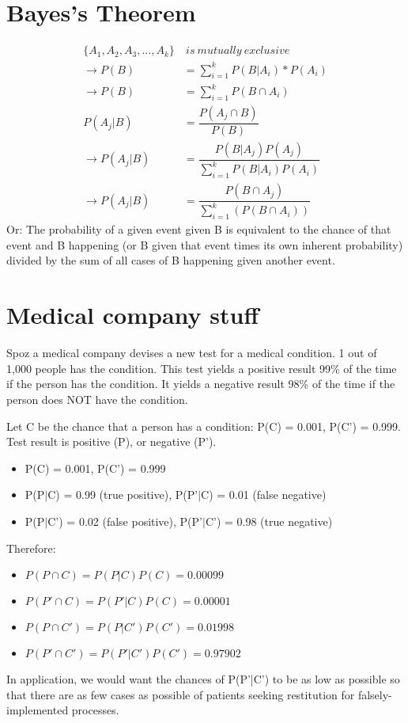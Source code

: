 \documentclass[]{article}
\begin{document}
	\pagebreak
	\section{Bayes's Theorem}
		\begin{align*}
			\{A_1, A_2, A_3,...,A_k\}&\ is\ mutually\ exclusive\\ 
			        \rightarrow P(B) &= \sum_{i = 1}^{k}P(B|A_i)*P(A_i) \\
			        \rightarrow P(B) &= \sum_{i = 1}^{k}P(B\cap A_i) \\
			                P(A_j|B) &= \dfrac{P(A_j\cap B)}{P(B)} \\
			    \rightarrow P(A_j|B) &= \dfrac{P(B|A_j)P(A_j)}
			                            {
				                            \sum_{i=1}^{k}P(B|A_i)P(A_i)
			                            }\\
			    \rightarrow P(A_j|B) &= \dfrac{P(B\cap A_j)}{
			    	                        \sum_{i=1}^{k}(P(B\cap A_i))
		    	                        }
		\end{align*}
		Or: The probability of a given event given B is equivalent to the chance of that event and B happening (or B given that event times its own inherent probability) divided by the sum of all cases of B happening given another event.
		
	\section{Medical company stuff}
		Spoz a medical company devises a new test for a medical condition. 1 out of 1,000 people has the condition. This test yields a positive result 99\% of the time if the person has the condition. It yields a negative result 98\% of the time if the person does NOT have the condition.
		
		Let C be the chance that a person has a condition: P(C) = 0.001, P(C') = 0.999. Test result is positive (P), or negative (P').
		
		\begin{itemize}
			\item P(C) = 0.001, P(C') = 0.999
			\item P(P$|$C) = 0.99 (true positive), P(P'$|$C) = 0.01 (false negative)
			\item P(P$|$C') = 0.02 (false positive), P(P'$|$C') = 0.98 (true negative)
		\end{itemize}
		Therefore:
		\begin{itemize}
			\item $P(P\cap C) = P(P|C)P(C) = 0.00099$
			\item $P(P'\cap C) = P(P'|C)P(C) = 0.00001$
			\item $P(P\cap C') = P(P|C')P(C') = 0.01998$
			\item $P(P'\cap C') = P(P'|C')P(C') = 0.97902$
		\end{itemize}
	
		In application, we would want the chances of P(P'|C') to be as low as possible so that there are as few cases as possible of patients seeking restitution for falsely-implemented processes.
		
\end{document}
